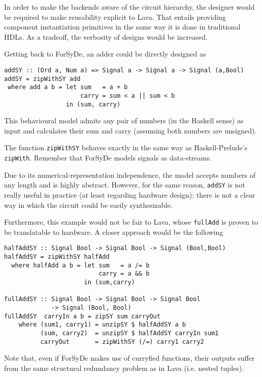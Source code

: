 \begin{itemize}
    In order to make the backends aware of the circuit hierarchy, the designer
    would be required to make reusability explicit to Lava.  That entails
    providing component instantiation primitives in the same way it is done in
    traditional HDLs. As a tradeoff, the verbosity of designs would be
    increased.
 
\end{itemize} 

Getting back to ForSyDe, an adder could be directly designed as

\begin{lstlisting}
addSY :: (Ord a, Num a) => Signal a -> Signal a -> Signal (a,Bool)
addSY = zipWithSY add
 where add a b = let sum   = a + b
                     carry = sum < a || sum < b 
                 in (sum, carry)
\end{lstlisting} 

This behavioural model admits any pair of numbers (in the Haskell sense) as
input and calculates their sum and carry (assuming both numbers are unsigned).

The function \texttt{zipWithSY} behaves exactly in the same way as
Haskell-Prelude's \texttt{zipWith}. Remember that ForSyDe models
signals as data-streams.

Due to its numerical-representation independence, the model accepts numbers of
any length and is highly abstract. However, for the same reason,
\texttt{addSY} is not really useful in practice (at least regarding hardware
design): there is not a clear way in which the circuit could be easily
synthesizable.

Furthermore, this example would not be fair to Lava, whose
\texttt{fullAdd} is proven to be translatable to hardware. A closer
approach would be the following


\begin{lstlisting}
halfAddSY :: Signal Bool -> Signal Bool -> Signal (Bool,Bool)
halfAddSY = zipWithSY halfAdd
  where halfAdd a b = let sum   = a /= b
                          carry = a && b
                      in (sum,carry)

fullAddSY :: Signal Bool -> Signal Bool -> Signal Bool 
             -> Signal (Bool, Bool)
fullAddSY  carryIn a b = zipSY sum carryOut 
    where (sum1, carry1) = unzipSY $ halfAddSY a b
          (sum, carry2)  = unzipSY $ halfAddSY carryIn sum1
          carryOut       = zipWithSY (/=) carry1 carry2
\end{lstlisting}

Note that, even if ForSyDe makes use of curryfied functions, their outputs
suffer from the same structural redundancy problem as in Lava (i.e. nested
tuples). 


